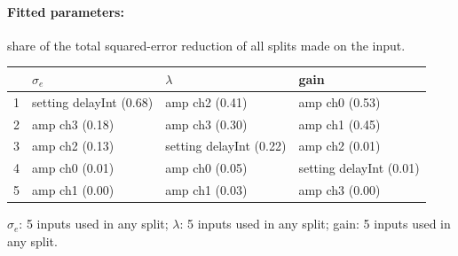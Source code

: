 \paragraph{Fitted parameters:} share of the total squared-error reduction of all splits made on the input.
\begin{center}\footnotesize
\begin{tabular}{rp{}p{}p{}}
\toprule
 & $\sigma_e$ & $\lambda$ & gain \\
\midrule
1 & setting delayInt (0.68) & amp ch2 (0.41) & amp ch0 (0.53) \\
2 & amp ch3 (0.18) & amp ch3 (0.30) & amp ch1 (0.45) \\
3 & amp ch2 (0.13) & setting delayInt (0.22) & amp ch2 (0.01) \\
4 & amp ch0 (0.01) & amp ch0 (0.05) & setting delayInt (0.01) \\
5 & amp ch1 (0.00) & amp ch1 (0.03) & amp ch3 (0.00) \\
\bottomrule
\end{tabular}
\end{center}
{\footnotesize $\sigma_e$: 5 inputs used in any split; $\lambda$: 5 inputs used in any split; gain: 5 inputs used in any split.}
